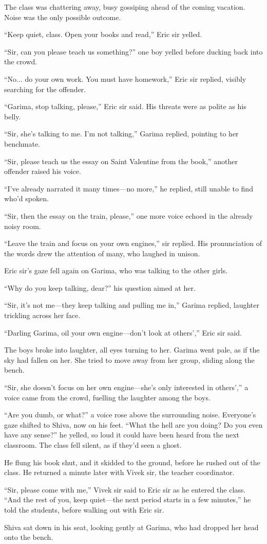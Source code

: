 The class was chattering away, busy gossiping ahead of the coming vacation. Noise was the only possible outcome.

``Keep quiet, class. Open your books and read,'' Eric sir yelled.

``Sir, can you please teach us something?'' one boy yelled before ducking back into the crowd.

``No... do your own work. You must have homework,'' Eric sir replied, visibly searching for the offender.

``Garima, stop talking, please,'' Eric sir said. His threats were as polite as his belly. 

``Sir, she's talking to me. I'm not talking,'' Garima replied, pointing to her benchmate.

``Sir, please teach us the essay on Saint Valentine from the book,'' another offender raised his voice.

``I've already narrated it many times—no more,'' he replied, still unable to find who'd spoken.

``Sir, then the essay on the train, please,'' one more voice echoed in the already noisy room.

``Leave the train and focus on your own engines,'' sir replied. His pronunciation of the words drew the attention of many, who laughed in unison.

Eric sir's gaze fell again on Garima, who was talking to the other girls.

``Why do you keep talking, dear?'' his question aimed at her.

``Sir, it's not me—they keep talking and pulling me in,'' Garima replied, laughter trickling across her face.

``Darling Garima, oil your own engine—don't look at others','' Eric sir said.

The boys broke into laughter, all eyes turning to her. Garima went pale, as if the sky had fallen on her. She tried to move away from her group, sliding along the bench.

``Sir, she doesn't focus on her own engine—she's only interested in others','' a voice came from the crowd, fuelling the laughter among the boys.

``Are you dumb, or what?'' a voice rose above the surrounding noise. Everyone's gaze shifted to Shiva, now on his feet. ``What the hell are you doing? Do you even have any sense?'' he yelled, so loud it could have been heard from the next classroom. The class fell silent, as if they'd seen a ghost.

He flung his book shut, and it skidded to the ground, before he rushed out of the class. He returned a minute later with Vivek sir, the teacher coordinator.

``Sir, please come with me,'' Vivek sir said to Eric sir as he entered the class. ``And the rest of you, keep quiet—the next period starts in a few minutes,'' he told the students, before walking out with Eric sir.

Shiva sat down in his seat, looking gently at Garima, who had dropped her head onto the bench. 